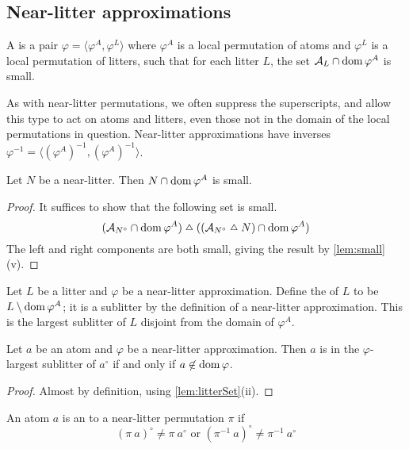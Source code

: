 \subsection{Near-litter approximations}
\begin{definition}
    A  is a pair \( \varphi = \langle \varphi^A, \varphi^L \rangle \) where \( \varphi^A \) is a local permutation of atoms and \( \varphi^L \) is a local permutation of litters, such that for each litter \( L \), the set \( \mathcal A_L \cap \operatorname{dom} \varphi^A \) is small.
\end{definition}
As with near-litter permutations, we often suppress the superscripts, and allow this type to act on atoms and litters, even those not in the domain of the local permutations in question.
Near-litter approximations have inverses \( \varphi^{-1} = \langle (\varphi^A)^{-1}, (\varphi^A)^{-1} \rangle \).
\begin{lemma}
    \label{lem:nearLitter_domain_small}
    Let \( N \) be a near-litter.
    Then \( N \cap \operatorname{dom} \varphi^A \) is small.
\end{lemma}
\begin{proof}
    It suffices to show that the following set is small.
    \[ (\mathcal A_{N^\circ} \cap \dom \varphi^A) \symmdiff ((\mathcal A_{N^\circ} \symmdiff N) \cap \dom \varphi^A) \]
    The left and right components are both small, giving the result by \cref{lem:small}(v).
\end{proof}
\begin{definition}
    Let \( L \) be a litter and \( \varphi \) be a near-litter approximation.
    Define the  of \( L \) to be \( L \setminus \operatorname{dom} \varphi^A \); it is a sublitter by the definition of a near-litter approximation.
    This is the largest sublitter of \( L \) disjoint from the domain of \( \varphi^A \).
\end{definition}
\begin{lemma}
    Let \( a \) be an atom and \( \varphi \) be a near-litter approximation.
    Then \( a \) is in the \( \varphi \)-largest sublitter of \( a^\circ \) if and only if \( a \not\in \operatorname{dom} \varphi \).
\end{lemma}
\begin{proof}
    Almost by definition, using \cref{lem:litterSet}(ii).
\end{proof}
\begin{definition}
    An atom \( a \) is an  to a near-litter permutation \( \pi \) if
    \[ (\pi\ a)^\circ \neq \pi\ a^\circ \text{ or } (\pi^{-1}\ a)^\circ \neq \pi^{-1}\ a^\circ \]
\end{definition}
